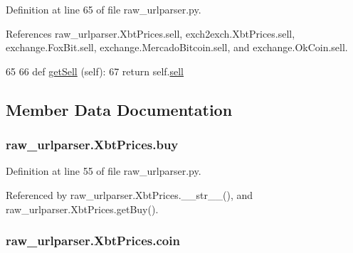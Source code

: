 Definition at line 65 of file raw\-\_\-urlparser.\-py.



References raw\-\_\-urlparser.\-Xbt\-Prices.\-sell, exch2exch.\-Xbt\-Prices.\-sell, exchange.\-Fox\-Bit.\-sell, exchange.\-Mercado\-Bitcoin.\-sell, and exchange.\-Ok\-Coin.\-sell.


\begin{DoxyCode}
65 
66     \textcolor{keyword}{def }\hyperlink{classraw__urlparser_1_1_xbt_prices_a141a6794eea34f738070970fefc0f854}{getSell} (self):
67         \textcolor{keywordflow}{return} self.\hyperlink{classraw__urlparser_1_1_xbt_prices_a22b483cac27a5b17f9e7b265c219bb99}{sell}
        
\end{DoxyCode}


\subsection{Member Data Documentation}
\hypertarget{classraw__urlparser_1_1_xbt_prices_a87eba659d6598ffd66c694535e1b7a7a}{
\subsubsection[{buy}]{\setlength{\rightskip}{0pt plus 5cm}raw\-\_\-urlparser.\-Xbt\-Prices.\-buy}}\label{classraw__urlparser_1_1_xbt_prices_a87eba659d6598ffd66c694535e1b7a7a}


Definition at line 55 of file raw\-\_\-urlparser.\-py.



Referenced by raw\-\_\-urlparser.\-Xbt\-Prices.\-\_\-\-\_\-str\-\_\-\-\_\-(), and raw\-\_\-urlparser.\-Xbt\-Prices.\-get\-Buy().

\hypertarget{classraw__urlparser_1_1_xbt_prices_a8d253ccd987bce28e3aaba7a9c486e5f}{
\subsubsection[{coin}]{\setlength{\rightskip}{0pt plus 5cm}raw\-\_\-urlparser.\-Xbt\-Prices.\-coin}}\label{classraw__urlparser_1_1_xbt_prices_a8d253ccd987bce28e3aaba7a9c486e5f}


